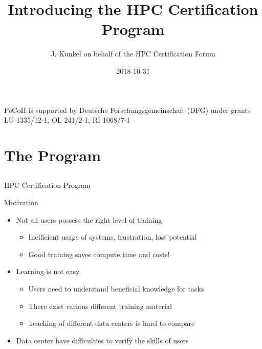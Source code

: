\documentclass[compress,aspectratio=169]{beamer}
\subtitle{}
\title{\huge Introducing the HPC Certification Program}
\author{J. Kunkel on behalf of the HPC Certification Forum}
\date{2018-10-31}
\institute{Computer Science Department}
\begin{document}
\begin{frame}[plain]{}
	\maketitle
	{\fontsize{5.85pt}{6pt}\selectfont PeCoH is supported by Deutsche Forschungsgemeinschaft (DFG) under grants LU 1335/12-1, OL 241/2-1, RI 1068/7-1}
\end{frame}






\section{The Program}
\sectionIntroHidden

\subsection{}

\begin{frame}{HPC Certification Program}
	\begin{block}{Motivation}
		\begin{itemize}

			\item Not all users possess the right level of training
				\begin{itemize}
				\item Inefficient usage of systems, frustration, lost potential
				\item Good training saves compute time and costs!
				\end{itemize}
			\item Learning is not easy
			\begin{itemize}
				\item Users need to understand beneficial knowledge for tasks
				\item There exist various different training material
				\item Teaching of different data centers is hard to compare
			\end{itemize}
			\item Data center have difficulties to verify the skills of users
		\end{itemize}
	\end{block}

\end{frame}
\end{document}
